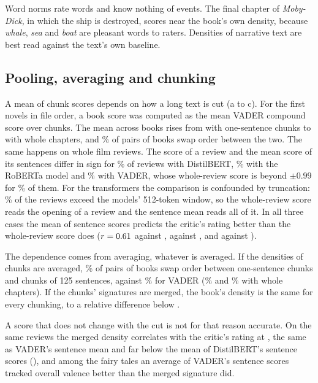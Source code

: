 Word norms rate words and know nothing of events. The final chapter of \emph{Moby-Dick}, in which the ship is destroyed, scores near the book's own density, because \emph{whale}, \emph{sea} and \emph{boat} are pleasant words to raters. Densities of narrative text are best read against the text's own baseline.

\figBook

\subsection{Pooling, averaging and chunking}

A mean of chunk scores depends on how a long text is cut (a to c). For the first \vaderBooks{} novels in file order, a book score was computed as the mean VADER compound score over chunks. The mean across books rises from \vaderOne{} with one-sentence chunks to \vaderChapter{} with whole chapters, and \vaderFlipChapter\% of pairs of books swap order between the two. The same happens on \partsReviews{} whole film reviews. The score of a review and the mean score of its sentences differ in sign for \partsDistilSign\% of reviews with DistilBERT, \partsRobertaSign\% with the RoBERTa model and \partsVaderSign\% with VADER, whose whole-review score is beyond $\pm0.99$ for \partsVaderSaturated\% of them. For the transformers the comparison is confounded by truncation: \truncShare\% of the reviews exceed the models' 512-token window, so the whole-review score reads the opening of a review and the sentence mean reads all of it. In all three cases the mean of sentence scores predicts the critic's rating better than the whole-review score does ($r=0.61$ against \partsDistilWhole, \partsRobertaSent{} against \partsRobertaWhole, and \partsVaderSent{} against \partsVaderWhole).

The dependence comes from averaging, whatever is averaged. If the densities of chunks are averaged, \densFlipLast\% of pairs of books swap order between one-sentence chunks and chunks of 125 sentences, against \vaderFlipLast\% for VADER (\densFlipChapter\% and \vaderFlipChapter\% with whole chapters). If the chunks' signatures are merged, the book's density is the same for every chunking, to a relative difference below \sgwSpread.

A score that does not change with the cut is not for that reason accurate. On the same \partsReviews{} reviews the merged density correlates with the critic's rating at \partsSgwDensity, the same as VADER's sentence mean and far below the mean of DistilBERT's sentence scores (\partsDistilSent), and among the fairy tales an average of VADER's sentence scores tracked overall valence better than the merged signature did.


